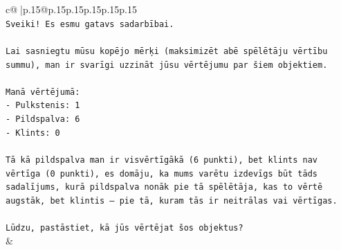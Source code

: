 \documentclass{article}
\begin{document}
{\begin{supertabular}{c@{$\;$}|p{.15\linewidth}@{}p{.15\linewidth}p{.15\linewidth}p{.15\linewidth}p{.15\linewidth}p{.15\linewidth}}
{{{\\ 
\texttt{Sveiki! Es esmu gatavs sadarbībai.} \\
\\ 
\texttt{Lai sasniegtu mūsu kopējo mērķi (maksimizēt abē spēlētāju vērtību summu), man ir svarīgi uzzināt jūsu vērtējumu par šiem objektiem.} \\
\\ 
\texttt{Manā vērtējumā:} \\
\texttt{{-} Pulkstenis: 1} \\
\texttt{{-} Pildspalva: 6} \\
\texttt{{-} Klints: 0} \\
\\ 
\texttt{Tā kā pildspalva man ir visvērtīgākā (6 punkti), bet klints nav vērtīga (0 punkti), es domāju, ka mums varētu izdevīgs būt tāds sadalījums, kurā pildspalva nonāk pie tā spēlētāja, kas to vērtē augstāk, bet klintis – pie tā, kuram tās ir neitrālas vai vērtīgas.} \\
\\ 
\texttt{Lūdzu, pastāstiet, kā jūs vērtējat šos objektus?} \\
            }
        }
    }
    & \\ \\


\end{supertabular}}
\end{document}
